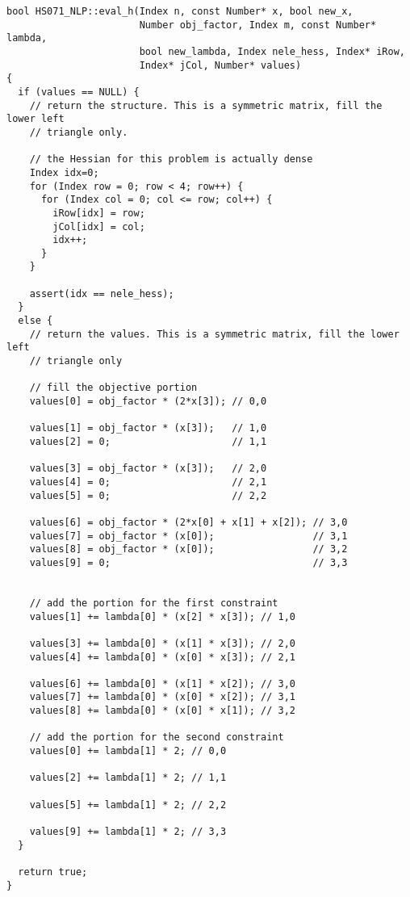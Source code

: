 \documentclass[10pt]{article}
\begin{document}
\begin{footnotesize}
\begin{verbatim}
bool HS071_NLP::eval_h(Index n, const Number* x, bool new_x,
                       Number obj_factor, Index m, const Number* lambda,
                       bool new_lambda, Index nele_hess, Index* iRow,
                       Index* jCol, Number* values)
{
  if (values == NULL) {
    // return the structure. This is a symmetric matrix, fill the lower left
    // triangle only.

    // the Hessian for this problem is actually dense
    Index idx=0;
    for (Index row = 0; row < 4; row++) {
      for (Index col = 0; col <= row; col++) {
        iRow[idx] = row; 
        jCol[idx] = col;
        idx++;
      }
    }
    
    assert(idx == nele_hess);
  }
  else {
    // return the values. This is a symmetric matrix, fill the lower left
    // triangle only

    // fill the objective portion
    values[0] = obj_factor * (2*x[3]); // 0,0

    values[1] = obj_factor * (x[3]);   // 1,0
    values[2] = 0;                     // 1,1

    values[3] = obj_factor * (x[3]);   // 2,0
    values[4] = 0;                     // 2,1
    values[5] = 0;                     // 2,2

    values[6] = obj_factor * (2*x[0] + x[1] + x[2]); // 3,0
    values[7] = obj_factor * (x[0]);                 // 3,1
    values[8] = obj_factor * (x[0]);                 // 3,2
    values[9] = 0;                                   // 3,3


    // add the portion for the first constraint
    values[1] += lambda[0] * (x[2] * x[3]); // 1,0
    
    values[3] += lambda[0] * (x[1] * x[3]); // 2,0
    values[4] += lambda[0] * (x[0] * x[3]); // 2,1

    values[6] += lambda[0] * (x[1] * x[2]); // 3,0
    values[7] += lambda[0] * (x[0] * x[2]); // 3,1
    values[8] += lambda[0] * (x[0] * x[1]); // 3,2

    // add the portion for the second constraint
    values[0] += lambda[1] * 2; // 0,0

    values[2] += lambda[1] * 2; // 1,1

    values[5] += lambda[1] * 2; // 2,2

    values[9] += lambda[1] * 2; // 3,3
  }

  return true;
}
\end{verbatim}
\end{footnotesize}
\end{document}
